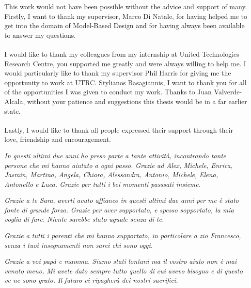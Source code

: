 
\begin{acknowledgements}      

This work would not have been possible without the advice and support of many. Firstly, I want to thank my supervisor, Marco Di Natale, for having helped me to get into the domain of Model-Based Design and for having always been available to answer my questions. %

\paragraph{} I would like to thank my colleagues from my internship at United Technologies Research Centre, you supported me greatly and were always willing to help me. I would particularly like to thank my supervisor Phil Harris for giving me the opportunity to work at UTRC. Stylianos Basagiannis, I want to thank you for all of the opportunities I was given to conduct my work. Thanks to Juan Valverde-Alcala, without your patience and suggestions this thesis would be in a far earlier state.


\paragraph{} Lastly, I would like to thank all people expressed their support through their love, friendship and encouragement.
\par\textit{In questi ultimi due anni ho preso parte a tante attivit\`{a}, incontrando tante persone che mi hanno aiutato a ogni passo. Grazie ad Alex, Michele, Enrica, Jasmin, Martina, Angela, Chiara, Alessandra, Antonio, Michele, Elena, Antonello e Luca. Grazie per tutti i bei momenti passsati insieme.}
\par\textit{Grazie a te Sara, averti avuto affianco in questi ultimi due anni per me \`{e} stato fonte di grande forza. Grazie per aver supportato, e spesso sopportato, la mia voglia di fare. Niente sarebbe stato uguale senza di te.}
\par\textit{Grazie a tutti i parenti che mi hanno supportato, in particolare a zio Francesco, senza i tuoi insegnamenti non sarei chi sono oggi.}
\par \emph{Grazie a voi pap\`{a} e mamma. Siamo stati lontani ma il vostro aiuto non \`{e} mai venuto meno. Mi avete dato sempre tutto quello di cui avevo bisogno e di questo ve ne sono grato. Il futuro ci ripagher\`{a} dei nostri sacrifici.}


{\raggedleft\vfill\itshape{}\par
}


\end{acknowledgements}
